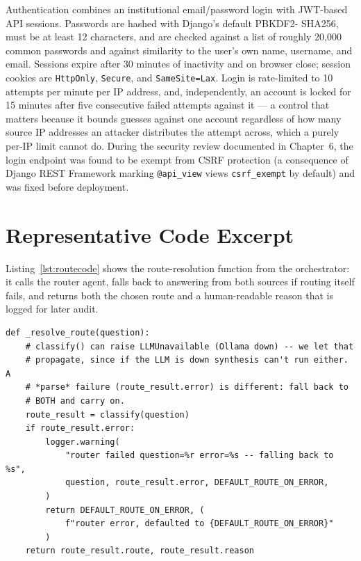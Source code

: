 \documentclass[11pt,a4paper,oneside]{report}
\begin{document}
Authentication combines an institutional email/password login with
JWT-based API sessions. Passwords are hashed with Django's default PBKDF2-
SHA256, must be at least 12 characters, and are checked against a list of
roughly 20,000 common passwords and against similarity to the user's own
name, username, and email. Sessions expire after 30 minutes of inactivity and
on browser close; session cookies are \texttt{HttpOnly}, \texttt{Secure}, and
\texttt{SameSite=Lax}. Login is rate-limited to 10 attempts per minute per
IP address, and, independently, an account is locked for 15 minutes after
five consecutive failed attempts against it --- a control that matters
because it bounds guesses against one account regardless of how many source
IP addresses an attacker distributes the attempt across, which a purely
per-IP limit cannot do. During the security review documented in
Chapter~6, the login endpoint was found to be exempt from CSRF protection
(a consequence of Django REST Framework marking \texttt{@api\_view} views
\texttt{csrf\_exempt} by default) and was fixed before deployment.

\section{Representative Code Excerpt}

Listing~\ref{lst:routecode} shows the route-resolution function from the
orchestrator: it calls the router agent, falls back to answering from both
sources if routing itself fails, and returns both the chosen route and a
human-readable reason that is logged for later audit.

\begin{lstlisting}[caption={Route resolution in the orchestrator (\texttt{orchestrator/service.py})}, label={lst:routecode}]
def _resolve_route(question):
    # classify() can raise LLMUnavailable (Ollama down) -- we let that
    # propagate, since if the LLM is down synthesis can't run either. A
    # *parse* failure (route_result.error) is different: fall back to
    # BOTH and carry on.
    route_result = classify(question)
    if route_result.error:
        logger.warning(
            "router failed question=%r error=%s -- falling back to %s",
            question, route_result.error, DEFAULT_ROUTE_ON_ERROR,
        )
        return DEFAULT_ROUTE_ON_ERROR, (
            f"router error, defaulted to {DEFAULT_ROUTE_ON_ERROR}"
        )
    return route_result.route, route_result.reason
\end{lstlisting}
\end{document}
